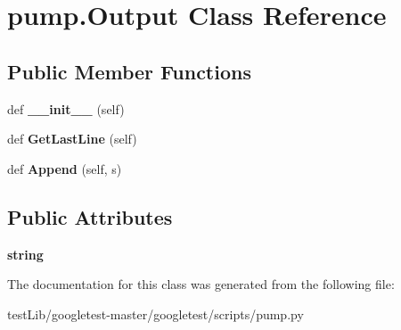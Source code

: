 \hypertarget{classpump_1_1Output}{}\section{pump.\+Output Class Reference}
\label{classpump_1_1Output}
\subsection*{Public Member Functions}
\begin{DoxyCompactItemize}
\item 
\mbox{\label{classpump_1_1Output_a01a703055e40078561bd4a5011de4a6d}} 
def {\bfseries \+\_\+\+\_\+init\+\_\+\+\_\+} (self)
\item 
\mbox{\label{classpump_1_1Output_a6ece94d24be171bae2a2234c052b4c58}} 
def {\bfseries Get\+Last\+Line} (self)
\item 
\mbox{\label{classpump_1_1Output_a6f284bb3f80e03594bc28286c695f5a7}} 
def {\bfseries Append} (self, s)
\end{DoxyCompactItemize}
\subsection*{Public Attributes}
\begin{DoxyCompactItemize}
\item 
\mbox{\label{classpump_1_1Output_a8786848ab3d235189379c449a446f883}} 
{\bfseries string}
\end{DoxyCompactItemize}


The documentation for this class was generated from the following file\+:\begin{DoxyCompactItemize}
\item 
test\+Lib/googletest-\/master/googletest/scripts/pump.\+py\end{DoxyCompactItemize}
